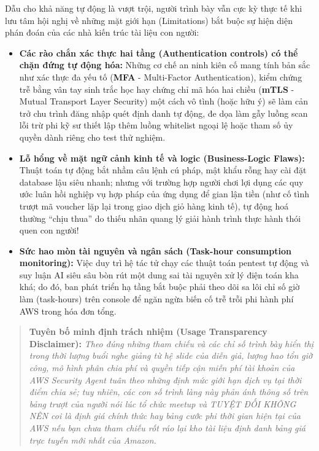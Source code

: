 Dẫu cho khả năng tự động là vượt trội, người trình bày vẫn cực kỳ thực
tế khi lưu tâm hội nghị về những mặt giới hạn (Limitations) bắt buộc sự
hiện diện phán đoán của các nhà kiến trúc tài liệu con người:

\begin{itemize}
\tightlist
\item
  \textbf{Các rào chắn xác thực hai tầng (Authentication controls) có
  thể chặn đứng tự động hóa:} Những cơ chế an ninh kiên cố mang tính bản
  sắc như xác thực đa yếu tố (\textbf{MFA} - Multi-Factor
  Authentication), kiểm chứng trễ bằng vân tay sinh trắc học hay chứng
  chỉ mã hóa hai chiều (\textbf{mTLS} - Mutual Transport Layer Security)
  một cách vô tình (hoặc hữu ý) sẽ làm cản trở chu trình đăng nhập quét
  định danh tự động, đe dọa làm gẫy luồng scan lỗi trừ phi kỹ sư thiết
  lập thêm luồng whitelist ngoại lệ hoặc tham số ủy quyền dành riêng cho
  test thử nghiệm.
\item
  \textbf{Lỗ hổng về mặt ngữ cảnh kinh tế và logic (Business-Logic
  Flaws):} Thuật toán tự động bắt nhầm câu lệnh cú pháp, mật khẩu rỗng
  hay cài đặt database lậu siêu nhanh; nhưng với trường hợp người chơi
  lợi dụng các quy ước luân hồi nghiệp vụ hợp pháp của ứng dụng để gian
  lận tiền (như cố tình trượt mã voucher lặp lại trong giao dịch giỏ
  hàng kinh tế), tự động hoá thường ``chịu thua'' do thiếu nhãn quang lý
  giải hành trình thực hành thói quen con người!
\item
  \textbf{Sức hao mòn tài nguyên và ngân sách (Task-hour consumption
  monitoring):} Việc duy trì hệ tác tử chạy các thuật toán pentest tự
  động và suy luận AI siêu sâu bòn rút một dung sai tài nguyên xử lý
  điện toán kha khá; do đó, ban phát triển hạ tầng bắt buộc phải theo
  dõi sa lôi chỉ số giờ làm (task-hours) trên console để ngăn ngừa biến
  cố trễ trỗi phi hành phí AWS trong hóa đơn tổng.
\end{itemize}

\begin{quote}
\textbf{Tuyên bố minh định trách nhiệm (Usage Transparency Disclaimer):}
\emph{Theo đúng những tham chiếu và các chỉ số trình bày hiển thị trong
thời lượng buổi nghe giảng từ hệ slide của diễn giả, lượng hao tổn giờ
công, mô hình phân chia phí và quyền tiếp cận miễn phí tài khoản của AWS
Security Agent tuân theo những định mức giới hạn dịch vụ tại thời điểm
chia sẻ; tuy nhiên, các con số trình làng này phản ánh thông số trên
bảng trượt của người nói lúc tổ chức meetup và TUYỆT ĐỐI KHÔNG NÊN coi
là định giá chính thức hay bảng cước phi thời gian hiện tại của AWS nếu
bạn chưa tham chiếu rốt ráo lại kho tài liệu định danh bảng giá trực
tuyến mới nhất của Amazon.}
\end{quote}

